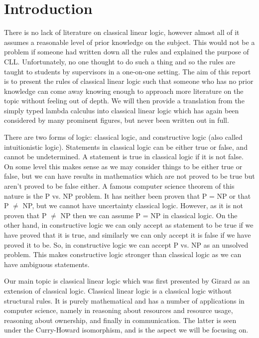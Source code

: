 \chapter{Introduction}
\label{chap: intro}


\noindent
There is no lack of literature on classical linear logic, however almost all of it assumes a reasonable 
level of prior knowledge on the subject. This would not be a problem if someone had written down all the 
rules and explained the purpose of CLL. Unfortunately, no one thought to do such a thing and so the rules 
are taught to students by supervisors in a one-on-one setting. The aim of this report is to present 
the rules of classical linear logic such that someone who has no prior knowledge can come away knowing 
enough to approach more literature on the topic without feeling out of depth. We will then provide a 
translation from the simply typed lambda calculus into classical linear logic which has again been 
considered by many prominent figures, but never been written out in full. 

There are two forms of logic: classical logic, and constructive logic (also called intuitionistic logic). 
Statements in classical logic 
can be either true or false, and cannot be undetermined. A statement is true in classical logic if it 
is not false. On some level this makes sense as we may consider things to be either true or false, 
but we can have results in mathematics which are not proved to be true but aren't proved to be false 
either. A famous computer science theorem of this nature is the P vs. NP problem. It has neither 
been proven that P = NP or that P $\ne$ NP, but we cannot have uncertainty classical logic. However, as 
it is not proven that P $\ne$ NP then we can assume P = NP in classical logic. On the other hand, in 
constructive logic we can only accept as statement to be true if we have proved that it is true, 
and similarly we can only accept it is false if we have proved it to be. So, in constructive logic 
we can accept P vs. NP as an unsolved problem. This makes constructive logic stronger than classical 
logic as we can have ambiguous statements.

Our main topic is classical linear logic which was first presented by Girard as an extension of classical 
logic. Classical linear logic is a classical logic without structural rules. It is purely mathematical and has a 
number of applications in computer science, namely in reasoning about resources and resource usage, reasoning 
about ownership, and finally in communication. The latter is seen under the Curry-Howard isomorphism, and is 
the aspect we will be focusing on. 

